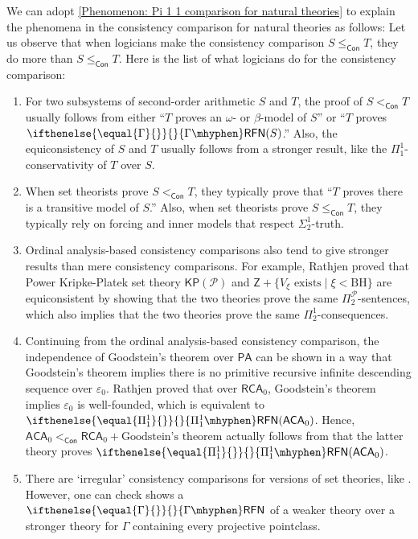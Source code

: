 \documentclass{mhkr}
\newcommand{\Con}{\mathsf{Con}}
\newcommand{\RFN}[1][]{\ifthenelse{\equal{#1}{}}{}{#1\mhyphen}\mathsf{RFN}}
\newcommand{\KP}{\mathsf{KP}}
\newcommand{\RCA}{\mathsf{RCA}}
\newcommand{\ACA}{\mathsf{ACA}}
\newcommand{\PA}{\mathsf{PA}}
\begin{document}
{We can adopt \autoref{Phenomenon: Pi 1 1 comparison for natural theories} to explain the phenomena in the consistency comparison for natural theories as follows: Let us observe that when logicians make the consistency comparison $S\le_\Con T$, they do more than $S\le_\Con T$.
Here is the list of what logicians do for the consistency comparison:
\begin{enumerate}
    \item For two subsystems of second-order arithmetic $S$ and $T$, the proof of $S<_\Con T$ usually follows from either ``$T$ proves an $\omega$- or $\beta$-model of $S$'' or ``$T$ proves $\RFN[\Gamma](S)$.'' Also, the equiconsistency of $S$ and $T$ usually follows from a stronger result, like the $\Pi^1_1$-conservativity of $T$ over $S$.
    \item When set theorists prove $S <_\Con T$, they typically prove that ``$T$ proves there is a transitive model of $S$.'' Also, when set theorists prove $S\le_\Con T$, they typically rely on forcing and inner models that respect $\Sigma^1_2$-truth.
    \item Ordinal analysis-based consistency comparisons also tend to give stronger results than mere consistency comparisons. For example, Rathjen \cite{Rathjen2014RelativizedOrdinalKP} proved that Power Kripke-Platek set theory $\KP(\mathcal{P})$ and $\mathsf{Z} + \{\text{$V_\xi$ exists}\mid \xi<\mathrm{BH}\}$ are equiconsistent by showing that the two theories prove the same $\Pi_2^\mathcal{P}$-sentences, which also implies that the two theories prove the same $\Pi^1_2$-consequences.
    \item Continuing from the ordinal analysis-based consistency comparison, the independence of Goodstein's theorem over $\PA$ can be shown in a way that Goodstein's theorem implies there is no primitive recursive infinite descending sequence over $\varepsilon_0$.
    Rathjen \cite{Rathjen2015Goodstein} proved that over $\RCA_0$, Goodstein's theorem implies $\varepsilon_0$ is well-founded, which is equivalent to $\RFN[\Pi^1_1](\ACA_0)$. Hence, $\ACA_0 <_\Con \RCA_0 + \text{Goodstein's theorem}$ actually follows from that the latter theory proves $\RFN[\Pi^1_1](\ACA_0)$.
    \item There are `irregular' consistency comparisons for versions of set theories, like \cite{Jeon2023WA}. However, one can check \cite{Jeon2023WA} shows a $\RFN[\Gamma]$ of a weaker theory over a stronger theory for $\Gamma$ containing every projective pointclass.
\end{enumerate}

}
\end{document}
